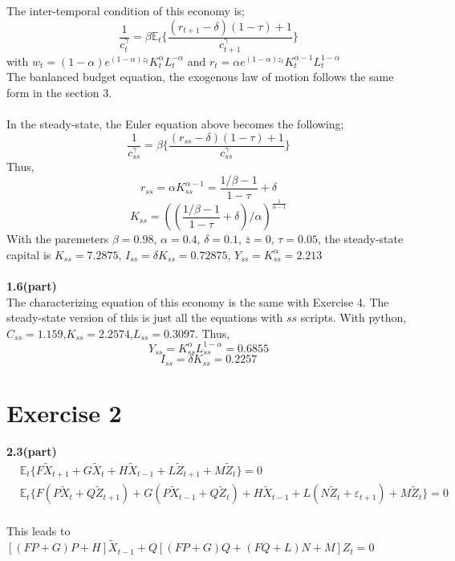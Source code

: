\documentclass[letterpaper,12pt]{article}
\theoremstyle{definition}
\begin{document}
\begin{spacing}{1.3}{}
The inter-temporal condition of this economy is;
\[\frac{1}{c_{t}^{\gamma}}  = \beta \mathbb{E}_t \{ \frac{(r_{t+1} - \delta)(1-\tau) + 1}{c_{t+1}^{\gamma}} \} \]
with $w_t = (1-\alpha) e^{(1-\alpha)z_t} K_{t}^{\alpha} L_{t}^{-\alpha} $ and $r_t= \alpha e^{(1-\alpha)z_t} K_{t}^{\alpha-1} L_{t}^{1-\alpha}$ \\
The banlanced budget equation, the exogenous law of motion follows the same form in the section 3. \\\\
In the steady-state, the Euler equation above becomes the following;
\[\frac{1}{c_{ss}^{\gamma}}  = \beta \{ \frac{(r_{ss} - \delta)(1-\tau) + 1}{c_{ss}^{\gamma}} \} \]
Thus,
\[r_{ss} = \alpha K_{ss}^{\alpha-1} = \frac{1/\beta -1}{1-\tau} + \delta \]
\[K_{ss} =(( \frac{1/\beta -1}{1-\tau} + \delta)/\alpha)^{\frac{1}{\alpha-1}}\]
With the paremeters $\beta = 0.98$, $\alpha = 0.4$, $\delta = 0.1$, $\bar{z} = 0$, $\tau = 0.05$, the steady-state capital is
$K_{ss} = 7.2875$, $I_{ss} = \delta K_{ss} = 0.72875$, $Y_{ss} = K_{ss}^{\alpha}=2.213$ \\\\
\noindent\textbf{1.6(part)}\\

The characterizing equation of this economy is the same with Exercise 4. The steady-state version of this is just all the equations with $ss$ scripts. With python,
$C_{ss} = 1.159$,$K_{ss} = 2.2574$,$L_{ss} = 0.3097$.
Thus,
\[Y_{ss} = K_{ss}^{\alpha} L_{ss}^{1-\alpha} = 0.6855 \]
\[I_{ss} = \delta K_{ss} = 0.2257\]

\section*{Exercise 2}
\noindent\textbf{2.3(part)}\\
\begin{align*}
 & \mathbb{E}_t \{ F \tilde{X}_{t+1} + G \tilde{X}_t + H \tilde{X}_{t-1} + L \tilde{Z}_{t+1} + M \tilde{Z}_t\} = 0   \\
  &\mathbb{E}_t \{ F (P \tilde{X}_{t} + Q \tilde{Z}_{t+1} ) + G (P \tilde{X}_{t-1} + Q \tilde{Z}_t) + H \tilde{X}_{t-1} + L (N \tilde{Z}_{t} + \varepsilon_{t+1}) + M \tilde{Z}_t\}=0 \\
\end{align*}

This leads to $  [(FP + G)P + H] \tilde{X}_{t-1} + Q [(FP + G)Q + (FQ + L)N + M] Z_t = 0$

\end{spacing}
\end{document}
